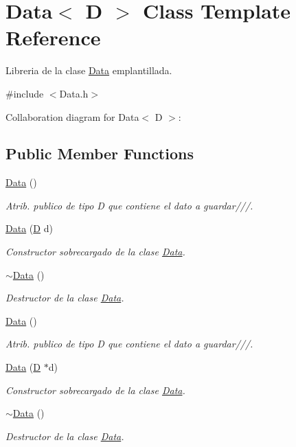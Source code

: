 \hypertarget{class_data}{\section{Data$<$ D $>$ Class Template Reference}
\label{class_data}
}


Libreria de la clase \hyperlink{class_data}{Data} emplantillada.  




{\ttfamily \#include $<$Data.\+h$>$}



Collaboration diagram for Data$<$ D $>$\+:
\subsection*{Public Member Functions}
\begin{DoxyCompactItemize}
\item 
\hyperlink{class_data_ad1ae14cfef8a5784600edf6b7ded343a}{Data} ()
\begin{DoxyCompactList}\small\item\em Atrib. publico de tipo D que contiene el dato a guardar///. \end{DoxyCompactList}\item 
\hyperlink{class_data_afb1b360c44f982bc3203fc1fe49be529}{Data} (\hyperlink{gwp_2main_8cpp_af316c33cc298530f245e8b55330e86b5}{D} d)
\begin{DoxyCompactList}\small\item\em Constructor sobrecargado de la clase \hyperlink{class_data}{Data}. \end{DoxyCompactList}\item 
\hyperlink{class_data_ae6eaaa822bbdf50d5e690a257fc6e03a}{$\sim$\+Data} ()
\begin{DoxyCompactList}\small\item\em Destructor de la clase \hyperlink{class_data}{Data}. \end{DoxyCompactList}\item 
\hyperlink{class_data_ad1ae14cfef8a5784600edf6b7ded343a}{Data} ()
\begin{DoxyCompactList}\small\item\em Atrib. publico de tipo D que contiene el dato a guardar///. \end{DoxyCompactList}\item 
\hyperlink{class_data_afc5ac2e8127c97cc7aca478938ccc92e}{Data} (\hyperlink{gwp_2main_8cpp_af316c33cc298530f245e8b55330e86b5}{D} $\ast$d)
\begin{DoxyCompactList}\small\item\em Constructor sobrecargado de la clase \hyperlink{class_data}{Data}. \end{DoxyCompactList}\item 
\hyperlink{class_data_ae6eaaa822bbdf50d5e690a257fc6e03a}{$\sim$\+Data} ()
\begin{DoxyCompactList}\small\item\em Destructor de la clase \hyperlink{class_data}{Data}. \end{DoxyCompactList}\end{DoxyCompactItemize}
